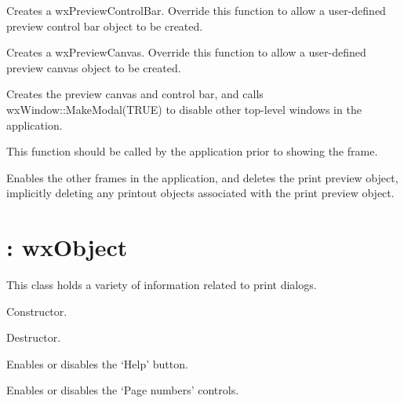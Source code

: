 
Creates a wxPreviewControlBar. Override this function to allow
a user-defined preview control bar object to be created.



Creates a wxPreviewCanvas. Override this function to allow
a user-defined preview canvas object to be created.



Creates the preview canvas and control bar, and calls
wxWindow::MakeModal(TRUE) to disable other top-level windows
in the application.

This function should be called by the application prior to
showing the frame.



Enables the other frames in the application, and deletes the print preview
object, implicitly deleting any printout objects associated with the print
preview object.

\section{: wxObject}\label{wxprintdata}

This class holds a variety of information related to print dialogs.



Constructor.



Destructor.



Enables or disables the `Help' button.



Enables or disables the `Page numbers' controls.

